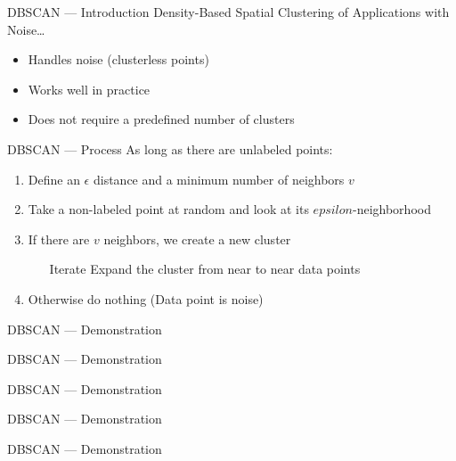 
\begin{frame}{DBSCAN --- Introduction}
  Density-Based Spatial Clustering of Applications with Noise…

  \begin{itemize}
    \item Handles noise (clusterless points)
    \item Works well in practice
    \item Does not require a predefined number of clusters
  \end{itemize}
\end{frame}

\begin{frame}{DBSCAN --- Process}
  As long as there are unlabeled points:

  \begin{enumerate}
    \item Define an $\epsilon$ distance and a minimum number of neighbors $v$
    \item Take a non-labeled point at random and look at its $epsilon$-neighborhood
    \item If there are $v$ neighbors, we create a new cluster
      \begin{itemize}
      \item[Iterate] Expand the cluster from near to near data points
      \end{itemize}
    \item Otherwise do nothing (Data point is noise)
    \end{enumerate}
\end{frame}

\begin{frame}{DBSCAN --- Demonstration}
\end{frame}

\begin{frame}{DBSCAN --- Demonstration}
\end{frame}

\begin{frame}{DBSCAN --- Demonstration}
\end{frame}

\begin{frame}{DBSCAN --- Demonstration}
\end{frame}

\begin{frame}{DBSCAN --- Demonstration}
\end{frame}

